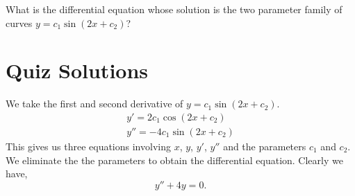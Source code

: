 \begin{QuizProblem}
  \label{quiz problem y = c1 sin( 2 x + c2 )}
  What is the differential equation whose solution is the two parameter 
  family of curves $y = c_1 \sin( 2 x + c_2 )$?

\end{QuizProblem}










\raggedbottom
\pagebreak
\flushbottom
\section{Quiz Solutions}


\begin{QuizSolution}
  \label{quiz solution y = c1 sin( 2 x + c2 )}
  We take the first and second derivative of $y = c_1 \sin( 2 x + c_2 )$.
  \begin{gather*}
    y' = 2 c_1 \cos( 2 x + c_2 ) 
    \\
    y'' = -4 c_1 \sin( 2 x + c_2 ) 
  \end{gather*}
  This gives us three equations involving $x$, $y$, $y'$, $y''$ and the 
  parameters $c_1$ and $c_2$.  We eliminate the the parameters to 
  obtain the differential equation.  Clearly we have,
  \[
  y'' + 4 y = 0.
  \]
\end{QuizSolution}





\raggedbottom
